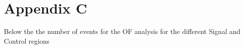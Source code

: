 \section{Appendix C}\label{sec:AppC}

Below the the number of events for the OF analysis for the different Signal and Control regions

